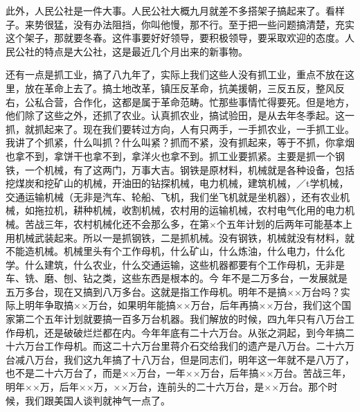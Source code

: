 此外，人民公社是一件大事。人民公社大概九月就差不多搭架子搞起来了。看样子。来势很猛，没有办法阻挡，你叫他慢，那不行。至于把一些问题搞清楚，充实这个架子，那就要冬春。这件事要好好领导，要积极领导，要采取欢迎的态度。人民公社的特点是大公社，这是最近几个月出来的新事物。

还有一点是抓工业，搞了八九年了，实际上我们这些人没有抓工业，重点不放在这里，放在革命上去了。搞土地改革，镇压反革命，抗美援朝，三反五反，整风反右，公私合营，合作化，这都是属于革命范畴。忙那些事情忙得要死。但是地方，他们除了这些之外，还抓了农业。认真抓农业，搞试验田，是从去年冬季起。这一抓，就抓起来了。现在我们要转过方向，人有只两手，一手抓农业，一手抓工业。我讲了个抓紧，什么叫抓？什么叫紧？抓而不紧，没有抓起来，等于不抓，你拿烟也拿不到，拿饼干也拿不到，拿洋火也拿不到。抓工业要抓紧。主要是抓一个钢铁，一个机械，有了这两门，万事大吉。钢铁是原材料，机械就是各种设备，包括挖煤炭和挖矿山的机械，开油田的钻探机械，电力机械，建筑机械，／t学机械，交通运输机械（无非是汽车、轮船、飞机，我们坐飞机就是坐机器），还有农业机械，如拖拉机，耕种机械，收割机械，农村用的运输机械，农村电气化用的电力机械。苦战三年，农村机械化还不会那么多，在第×个五年计划的后两年可能基本上用机械武装起来。所以一是抓钢铁，二是抓机械。没有钢铁，机械就没有材料，就不能造机械。机械里头有个工作母机，什么矿山，什么炼油，什么电力，什么化学。什么建筑，什么农业，什么交通运输，这些机器都要有个工作母机，无非是车、铣、磨、刨、钻之类，这些东西是根本的。今年不是二万多台，一发展就是五万多台，现在又搞到八万多台。这就是指工作母机。明年不是搞××万台吗？实际上明年争取搞××万台，如果明年能搞××万台，后年再搞××万台，我们这个国家第二个五年计划就要搞一百多万台机器。我们解放的时候，四九年只有八万台工作母机，还是破破烂烂都在内。今年年底有二十六万台。从张之洞起，到今年搞二十六万台工作母机。而这二十六万台里蒋介石交给我们的遗产是八万台。二十六万台减八万台，我们这九年搞了十八万台，但是同志们，明年这一年就不是八万了，也不是二十六万台了，而是××万台，一年××万台，后年搞××万台。苦战三年，明年××万，后年××万，××万台，连前头的二十六万台，是××万台。那个时候，我们跟美国人谈判就神气一点了。


